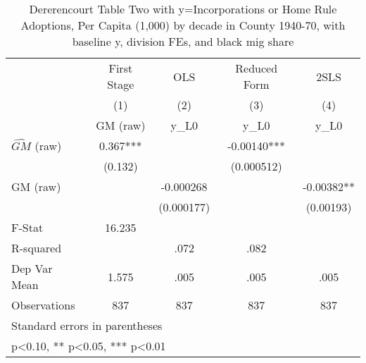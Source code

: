 \begin{table}[htbp]\centering
\def\sym#1{\ifmmode^{#1}\else\(^{#1}\)\fi}
\caption{Dererencourt Table Two with y=Incorporations or Home Rule Adoptions, Per Capita (1,000) by decade in County 1940-70, with baseline y, division FEs, and black mig share}
\begin{tabular}{l*{4}{c}}
\toprule
                    & First Stage   &         OLS   &Reduced Form   &        2SLS   \\
                    &\multicolumn{1}{c}{(1)}&\multicolumn{1}{c}{(2)}&\multicolumn{1}{c}{(3)}&\multicolumn{1}{c}{(4)}\\
                    &\multicolumn{1}{c}{GM  (raw)}&\multicolumn{1}{c}{y\_L0}&\multicolumn{1}{c}{y\_L0}&\multicolumn{1}{c}{y\_L0}\\
\midrule
$\hat{GM}$ (raw)    &       0.367***&               &    -0.00140***&               \\
                    &     (0.132)   &               &  (0.000512)   &               \\
\addlinespace
GM  (raw)           &               &   -0.000268   &               &    -0.00382** \\
                    &               &  (0.000177)   &               &   (0.00193)   \\
\midrule
F-Stat              &      16.235   &               &               &               \\
R-squared           &               &        .072   &        .082   &               \\
Dep Var Mean        &       1.575   &        .005   &        .005   &        .005   \\
Observations        &         837   &         837   &         837   &         837   \\
\bottomrule
\multicolumn{5}{l}{\footnotesize Standard errors in parentheses}\\
\multicolumn{5}{l}{\footnotesize * p<0.10, ** p<0.05, *** p<0.01}\\
\end{tabular}
\end{table}
